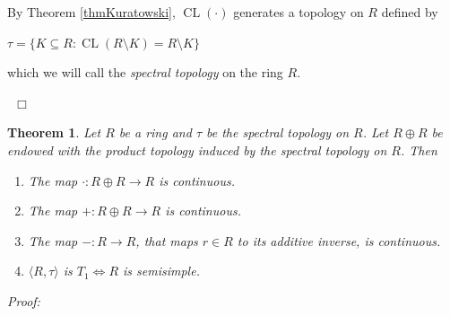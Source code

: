 \documentclass[12pt, oneside]{book}
\newtheorem{theorem}{Theorem}[subsection]
\newcommand{\proof}{{\noindent \it Proof:~}}
\newcommand{\qed}{\hfill ~$\Box$\\}
\def\CL{\operatorname{CL}}
\begin{document}
\noindent By Theorem \ref{thmKuratowski}, $\CL(\cdot)$ generates a topology on $R$ defined by 
\begin{center}
$\tau=\{K \subseteq R: \CL(R\setminus K)=R\setminus K\}$
\end{center} 
which we will call the {\sl spectral topology} on the ring $R$.

\qed

\begin{theorem} \label{TopologicalRing}
\normalfont
Let $R$ be a ring and $\tau$ be the spectral topology on $R$. Let $R \oplus R$ be endowed with the 
product topology induced by the spectral topology on $R$. Then
\begin{enumerate}[label=(\alph*)]
\item The map $\cdot : R \oplus R \rightarrow R$ is continuous.
\item The map $+ : R \oplus R \rightarrow R$ is continuous.
\item The map $- : R \rightarrow R$, that maps $r \in R$ to its additive inverse, is continuous.
\item $\langle R, \tau \rangle$ is $T_1 \iff R$ is semisimple.
\end{enumerate}
\end{theorem}

\proof 
\end{document}
